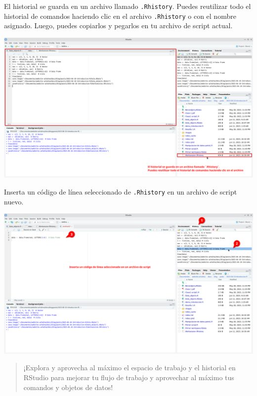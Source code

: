 \documentclass[
  letterpaper,
  DIV=11,
  numbers=noendperiod]{scrartcl}
\begin{document}
El historial se guarda en un archivo llamado \texttt{.Rhistory}. Puedes
reutilizar todo el historial de comandos haciendo clic en el archivo
\texttt{.Rhistory} o con el nombre asignado. Luego, puedes copiarlos y
pegarlos en tu archivo de script actual.

\includegraphics{images/Screenshot_20230611_103319.png}

Inserta un código de línea seleccionado de \texttt{.Rhistory} en un
archivo de script nuevo.

\includegraphics{images/Screenshot_20230611_103755.png}

\begin{quote}
¡Explora y aprovecha al máximo el espacio de trabajo y el historial en
RStudio para mejorar tu flujo de trabajo y aprovechar al máximo tus
comandos y objetos de datos!
\end{quote}


\printbibliography
\end{document}
